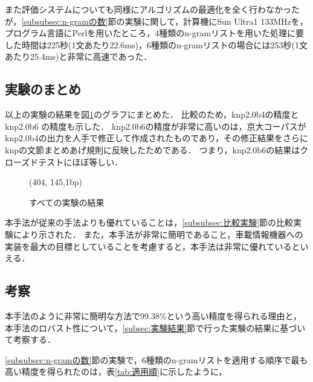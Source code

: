 また評価システムについても同様にアルゴリズムの最適化を全く行わなかったが，\ref{subsubsec:n-gramの数}節の実験に関して，計算機にSun Ultra1 133MHzを，プログラム言語にPerlを用いたところ，4種類のn-gramリストを用いた処理に要した時間は225秒(1文あたり22.6ms)，6種類のn-gramリストの場合には253秒(1文あたり25.4ms)と非常に高速であった．



\subsection{実験のまとめ}\label{subsec:まとめ}

以上の実験の結果を図\ref{fig:まとめ}のグラフにまとめた．
比較のため，knp2.0b4の精度とknp2.0b6
\cite{knp2.0b6}
の精度も示した．
knp2.0b6の精度が非常に高いのは，京大コーパスがknp2.0b4の出力を人手で修正して作成されたものであり，その修正結果をさらにknpの文節まとめあげ規則に反映したためである．
つまり，knp2.0b6の結果はクローズドテストにほぼ等しい．

\begin{figure}
  \begin{center}
    \begin{epsf}
    \end{epsf}
    \begin{draft}
    \atari(404, 145,1bp)
    \end{draft}
    \caption{すべての実験の結果}
    
    
    
    \label{fig:まとめ}
  \end{center}
\end{figure}

本手法が従来の手法よりも優れていることは，\ref{subsubsec:比較実験}節の比較実験により示された．
また，本手法が非常に簡明であること，車載情報機器への実装を最大の目標としていることを考慮すると，本手法は非常に優れているといえる．


\subsection{考察}\label{subsec:考察}

本手法のように非常に簡明な方法で99.38\%という高い精度を得られる理由と，本手法のロバスト性について，\ref{subsec:実験結果}節で行った実験の結果に基づいて考察する．

\ref{subsubsec:n-gramの数}節の実験で，6種類のn-gramリストを適用する順序で最も高い精度を得られたのは，表\ref{tab:適用順}に示したように，

